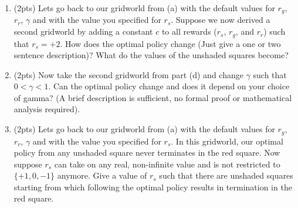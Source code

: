 \begin{enumerate}[label=(\alph*)]
\item (2pts) Lets go back to our gridworld from (a) with the default values for $r_g$, $r_r$, $\gamma$ and with the value you specified for $r_s$. Suppose we now derived a second gridworld by adding a constant $c$ to all rewards ($r_s$, $r_g$, and $r_r$) such that $r_s = +2$. How does the optimal policy change (Just give a one or two sentence description)? What do the values of the unshaded squares become?

\item (2pts) Now take the second gridworld from part (d) and change $\gamma$ such that $0 < \gamma < 1$. Can the optimal policy change and does it depend on your choice of gamma? (A brief description is sufficient, no formal proof or mathematical analysis required).

\item (2pts) Lets go back to our gridworld from (a) with the default values for $r_g$, $r_r$, $\gamma$ and with the value you specified for $r_s$. In this gridworld, our optimal policy from any unshaded square never terminates in the red square. Now suppose $r_s$ can take on any real, non-infinite value and is not restricted to $\{+1, 0, -1\}$ anymore. Give a value of $r_s$ such that there are unshaded squares starting from which following the optimal policy results in termination in the red square.


\end{enumerate}
